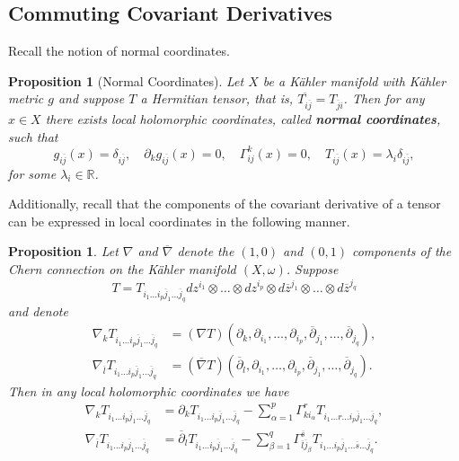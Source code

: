 \documentclass[12pt]{article}
\newtheorem{proposition}[theorem]{Proposition}
\numberwithin{equation}{section}
\newcommand{\R}{\mathbb{R}}
\renewcommand{\d}{\partial}
\newcommand{\dbar}{\overline{\partial}}
\newcommand{\oo}[1]{\overline{#1}}
\begin{document}
\subsection{Commuting Covariant Derivatives}

\noindent Recall the notion of normal coordinates.

\begin{proposition}[Normal Coordinates]
Let $X$ be a K\"ahler manifold with K\"ahler metric $g$ and suppose $T$ a Hermitian tensor, that is, $\oo{T_{i\oo{j}}} = T_{\oo{j}i}$. Then for any $x \in X$ there exists local holomorphic coordinates, called \textbf{normal coordinates}, such that
\begin{equation*}
    g_{i\oo{j}}(x) = \delta_{i\oo{j}}, \quad \d_k g_{i\oo{j}}(x) = 0, \quad \Gamma^k_{ij}(x) = 0, \quad T_{i\oo{j}}(x) = \lambda_i \delta_{i\oo{j}},
\end{equation*}
for some $\lambda_i \in \R$.
\end{proposition}

\noindent Additionally, recall that the components of the covariant derivative of a tensor can be expressed in local coordinates in the following manner.

\begin{proposition}
Let $\nabla$ and $\oo{\nabla}$ denote the $(1,0)$ and $(0,1)$ components of the Chern connection on the K\"ahler manifold $(X,\omega)$. Suppose
\begin{equation*}
    T = T_{i_1 \dots i_p \oo{j}_1 \dots \oo{j}_q} dz^{i_1} \otimes \dots \otimes dz^{i_p} \otimes d \oo{z}^{j_1} \otimes \dots \otimes d\oo{z}^{j_q}
\end{equation*}
and denote
\begin{align*}
    \nabla_k T_{i_1 \dots i_p \oo{j}_1 \dots \oo{j}_q} &= (\nabla T)(\d_k, \d_{i_1}, \dots, \d_{i_p}, \dbar_{j_1}, \dots, \dbar_{j_q}),\\
    \nabla_{\oo{l}} T_{i_1 \dots i_p \oo{j}_1 \dots \oo{j}_q} &= (\oo{\nabla} T)(\dbar_l, \d_{i_1}, \dots, \d_{i_p}, \dbar_{j_1}, \dots, \dbar_{j_q}).
\end{align*}
Then in any local holomorphic coordinates we have
\begin{align*}
    \nabla_k T_{i_1 \dots i_p \oo{j}_1 \dots \oo{j}_q} &= \d_k T_{i_1 \dots i_p \oo{j}_1 \dots \oo{j}_q} - \sum_{\alpha=1}^p \Gamma^{r}_{ki_\alpha} T_{i_1 \dots r \dots i_p \oo{j}_1 \dots \oo{j}_q},\\
    \nabla_{\oo{l}} T_{i_1 \dots i_p \oo{j}_1 \dots \oo{j}_q} &= \dbar_l T_{i_1 \dots i_p \oo{j}_1 \dots \oo{j}_q} - \sum_{\beta=1}^q \Gamma^{\oo{s}}_{\oo{l} \oo{j}_\beta} T_{i_1 \dots i_p \oo{j}_1 \dots \oo{s} \dots \oo{j}_q}.
\end{align*}
\end{proposition}
\end{document}
